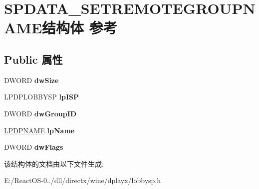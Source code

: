 \hypertarget{struct_s_p_d_a_t_a___s_e_t_r_e_m_o_t_e_g_r_o_u_p_n_a_m_e}{}\section{S\+P\+D\+A\+T\+A\+\_\+\+S\+E\+T\+R\+E\+M\+O\+T\+E\+G\+R\+O\+U\+P\+N\+A\+M\+E结构体 参考}
\label{struct_s_p_d_a_t_a___s_e_t_r_e_m_o_t_e_g_r_o_u_p_n_a_m_e}
\subsection*{Public 属性}
\begin{DoxyCompactItemize}
\item 
\mbox{\label{struct_s_p_d_a_t_a___s_e_t_r_e_m_o_t_e_g_r_o_u_p_n_a_m_e_acb0439f3aa49918346ae581a56185f5b}} 
D\+W\+O\+RD {\bfseries dw\+Size}
\item 
\mbox{\label{struct_s_p_d_a_t_a___s_e_t_r_e_m_o_t_e_g_r_o_u_p_n_a_m_e_a315def47237e516dc25588460ddb2e7a}} 
L\+P\+D\+P\+L\+O\+B\+B\+Y\+SP {\bfseries lp\+I\+SP}
\item 
\mbox{\label{struct_s_p_d_a_t_a___s_e_t_r_e_m_o_t_e_g_r_o_u_p_n_a_m_e_a5f5a726755cefc1532730bfaa6388d85}} 
D\+W\+O\+RD {\bfseries dw\+Group\+ID}
\item 
\mbox{\label{struct_s_p_d_a_t_a___s_e_t_r_e_m_o_t_e_g_r_o_u_p_n_a_m_e_a960d4658b70caaf1741e3f466186d459}} 
\hyperlink{structtag_d_p_n_a_m_e}{L\+P\+D\+P\+N\+A\+ME} {\bfseries lp\+Name}
\item 
\mbox{\label{struct_s_p_d_a_t_a___s_e_t_r_e_m_o_t_e_g_r_o_u_p_n_a_m_e_a4c9c37ce7f83a936135b8b8135b27cee}} 
D\+W\+O\+RD {\bfseries dw\+Flags}
\end{DoxyCompactItemize}


该结构体的文档由以下文件生成\+:\begin{DoxyCompactItemize}
\item 
E\+:/\+React\+O\+S-\/0../dll/directx/wine/dplayx/lobbysp.\+h\end{DoxyCompactItemize}
